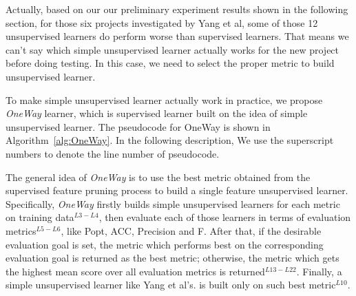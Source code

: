 Actually, based on our our preliminary experiment results
shown in the following section, for those six projects
investigated by Yang et al, some of those 12 unsupervised
learners do perform worse than supervised learners. 
That means we can't say which simple unsupervised learner actually
works for the new project before doing testing. In this case,
we need to select the proper metric to build unsupervised learner.



To make simple unsupervised learner actually work in practice,
we propose {\it OneWay} learner, which is supervised learner built on
the idea of simple unsupervised learner. The pseudocode for OneWay
is shown in Algorithm~\ref{alg:OneWay}. In the following description,
We use the superscript numbers to denote the line number of pseudocode. 

The general idea of {\it OneWay} is to use the best metric obtained
from the supervised feature pruning process to build a single feature
unsupervised learner. Specifically, {\it OneWay} firstly builds simple
unsupervised learners for each metric on training data$^{L3-L4}$, then
evaluate each of those learners in terms of evaluation metrics$^{L5-L6}$,
like Popt, ACC, Precision and F. After that, if the desirable
evaluation goal is set, the metric which performs best on the corresponding
evaluation goal is returned as the best metric; otherwise, the metric
which gets the highest mean score over all evaluation metrics is returned$^{L13-L22}$.
Finally, a simple unsupervised learner like Yang et al's. is built only
on such best metric$^{L10}$.




